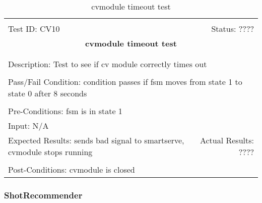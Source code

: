\documentclass[11pt]{article}
\begin{document}
\begin{center}
\begin{table}[H]
\begin{tabular}{|l r|}\hline&\\[-2mm]
	Test ID: CV10	&Status: ????\\[-3mm]
	\multicolumn{2}{|c|}{\textbf{\large{cvmodule timeout test}}}\\&\\\hline&\\[-3mm]
	\multicolumn{2}{|p{\textwidth}|}{Description: Test to see if cv module correctly times out }\\[1mm]\hline&\\[-3mm]
	\multicolumn{2}{|p{\textwidth}|}{Pass/Fail Condition: condition passes if fsm moves from state 1 to state 0 after 8 seconds}\\[1mm]\hline&\\[-3mm]
	\multicolumn{2}{|p{\textwidth}|}{Pre-Conditions: fsm is in state 1}\\[4mm]
	\multicolumn{2}{|p{\textwidth}|}{Input: N/A}\\[2mm]\hline
	\multicolumn{1}{|p{0.49\textwidth}}{Expected Results: sends bad signal to smartserve, cvmodule stops running}	&\multicolumn{1}{|p{0.45\textwidth}|}{Actual Results: ????}\\\hline&\\[-3mm]
	\multicolumn{2}{|p{\textwidth}|}{Post-Conditions: cvmodule is closed}\\\hline
\end{tabular}
\caption{cvmodule timeout test}
\end{table}
\end{center}

\subsubsection{ShotRecommender}
\end{document}
